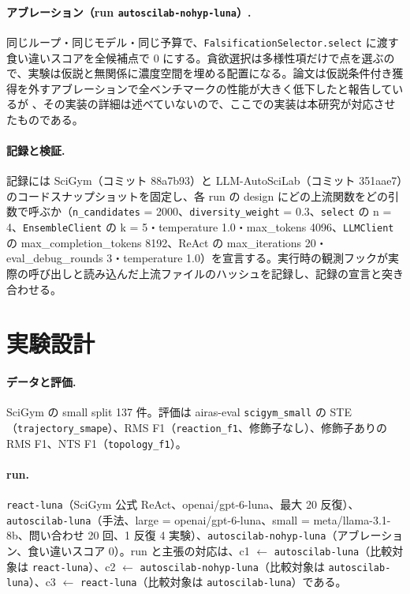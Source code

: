 \documentclass{article}
\begin{document}
\paragraph{アブレーション（run \texttt{autoscilab-nohyp-luna}）.}
同じループ・同じモデル・同じ予算で、\texttt{FalsificationSelector.select} に渡す食い違いスコアを全候補点で 0 にする。貪欲選択は多様性項だけで点を選ぶので、実験は仮説と無関係に濃度空間を埋める配置になる。論文は仮説条件付き獲得を外すアブレーションで全ベンチマークの性能が大きく低下したと報告しているが \cite[s2.p7]{kabra-2026-llm}、その実装の詳細は述べていないので、ここでの実装は本研究が対応させたものである。

\paragraph{記録と検証.}
記録には SciGym（コミット 88a7b93）と LLM-AutoSciLab（コミット 351aae7）のコードスナップショットを固定し、各 run の design にどの上流関数をどの引数で呼ぶか（\texttt{n\_candidates} = 2000、\texttt{diversity\_weight} = 0.3、\texttt{select} の n = 4、\texttt{EnsembleClient} の k = 5・temperature 1.0・max\_tokens 4096、\texttt{LLMClient} の max\_completion\_tokens 8192、ReAct の max\_iterations 20・eval\_debug\_rounds 3・temperature 1.0）を宣言する。実行時の観測フックが実際の呼び出しと読み込んだ上流ファイルのハッシュを記録し、記録の宣言と突き合わせる。

\section{実験設計}
\label{sec:design}
\paragraph{データと評価.}
SciGym の small split 137 件。評価は airas-eval \texttt{scigym\_small} の STE（\texttt{trajectory\_smape}）、RMS F1（\texttt{reaction\_f1}、修飾子なし）、修飾子ありの RMS F1、NTS F1（\texttt{topology\_f1}）。

\paragraph{run.}
\texttt{react-luna}（SciGym 公式 ReAct、openai/gpt-6-luna、最大 20 反復）、\texttt{autoscilab-luna}（手法、large = openai/gpt-6-luna、small = meta/llama-3.1-8b、問い合わせ 20 回、1 反復 4 実験）、\texttt{autoscilab-nohyp-luna}（アブレーション、食い違いスコア 0）。run と主張の対応は、c1 $\leftarrow$ \texttt{autoscilab-luna}（比較対象は \texttt{react-luna}）、c2 $\leftarrow$ \texttt{autoscilab-nohyp-luna}（比較対象は \texttt{autoscilab-luna}）、c3 $\leftarrow$ \texttt{react-luna}（比較対象は \texttt{autoscilab-luna}）である。
\end{document}
